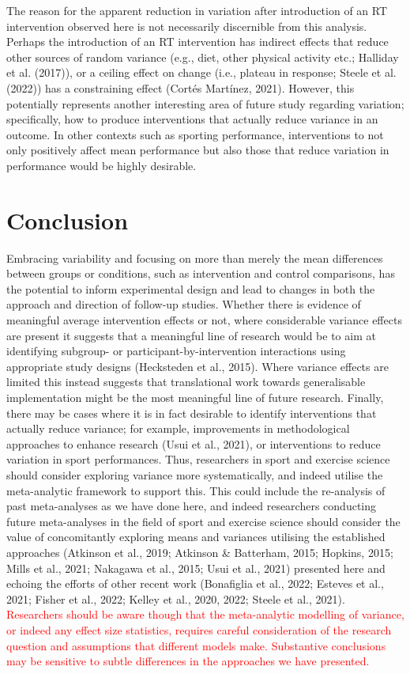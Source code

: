 \documentclass[
]{article}
\begin{document}
The reason for the apparent reduction in variation after introduction of an RT intervention observed here is not necessarily discernible from this analysis. Perhaps the introduction of an RT intervention has indirect effects that reduce other sources of random variance (e.g., diet, other physical activity etc.; Halliday et al. (2017)), or a ceiling effect on change (i.e., plateau in response; Steele et al. (2022)) has a constraining effect (Cortés Martínez, 2021). However, this potentially represents another interesting area of future study regarding variation; specifically, how to produce interventions that actually reduce variance in an outcome. In other contexts such as sporting performance, interventions to not only positively affect mean performance but also those that reduce variation in performance would be highly desirable.

\hypertarget{conclusion}{%
\section{Conclusion}\label{conclusion}}

Embracing variability and focusing on more than merely the mean differences between groups or conditions, such as intervention and control comparisons, has the potential to inform experimental design and lead to changes in both the approach and direction of follow-up studies. Whether there is evidence of meaningful average intervention effects or not, where considerable variance effects are present it suggests that a meaningful line of research would be to aim at identifying subgroup- or participant-by-intervention interactions using appropriate study designs (Hecksteden et al., 2015). Where variance effects are limited this instead suggests that translational work towards generalisable implementation might be the most meaningful line of future research. Finally, there may be cases where it is in fact desirable to identify interventions that actually reduce variance; for example, improvements in methodological approaches to enhance research (Usui et al., 2021), or interventions to reduce variation in sport performances. Thus, researchers in sport and exercise science should consider exploring variance more systematically, and indeed utilise the meta-analytic framework to support this. This could include the re-analysis of past meta-analyses as we have done here, and indeed researchers conducting future meta-analyses in the field of sport and exercise science should consider the value of concomitantly exploring means and variances utilising the established approaches (Atkinson et al., 2019; Atkinson \& Batterham, 2015; Hopkins, 2015; Mills et al., 2021; Nakagawa et al., 2015; Usui et al., 2021) presented here and echoing the efforts of other recent work (Bonafiglia et al., 2022; Esteves et al., 2021; Fisher et al., 2022; Kelley et al., 2020, 2022; Steele et al., 2021). \textcolor{red}{Researchers should be aware though that the meta-analytic modelling of variance, or indeed any effect size statistics, requires careful consideration of the research question and assumptions that different models make. Substantive conclusions may be sensitive to subtle differences in the approaches we have presented.}
\end{document}
